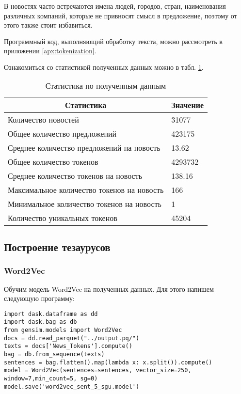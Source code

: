 \documentclass[coursework]{SCWorks}
\begin{document}
В новостях часто встречаются имена людей, городов, стран, наименования различных компаний, которые не привносят смысл в предложение, поэтому от этого также стоит избавиться.

Программный код, выполняющий обработку текста, можно рассмотреть в приложении \ref{apx:tokenization}.

Ознакомиться со статистикой полученных данных можно в табл. \ref{table:preprocess}.
\begin{table}[!h]
    \centering
    \begin{tabular}{|l|l|}
    \hline
    \multicolumn{1}{|c|}{\textbf{Статистика}}  & \multicolumn{1}{c|}{\textbf{Значение}} \\ \hline
    Количество новостей                        & 31077                                  \\ \hline
    Общее количество предложений               & 423175                                 \\ \hline
    Среднее количество предложений на новость  & 13.62                                  \\ \hline
    Общее количество токенов                   & 4293732                                \\ \hline
    Среднее количество токенов на новость      & 138.16                                 \\ \hline
    Максимальное количество токенов на новость & 166                                    \\ \hline
    Минимальное количество токенов на новость  & 1                                      \\ \hline
    Количество уникальных токенов              & 45204                                  \\ \hline
    \end{tabular} 
    \caption{Статистика по полученным данным}
    \label{table:preprocess}
\end{table}

\subsection{Построение тезаурусов}
\subsubsection{Word2Vec}
Обучим модель Word2Vec на полученных данных. Для этого напишем следующую программу:
\begin{verbatim}
import dask.dataframe as dd
import dask.bag as db
from gensim.models import Word2Vec
docs = dd.read_parquet("../output.pq/")
texts = docs['News_Tokens'].compute()
bag = db.from_sequence(texts)
sentences = bag.flatten().map(lambda x: x.split()).compute()
model = Word2Vec(sentences=sentences, vector_size=250, window=7,min_count=5, sg=0)
model.save('word2vec_sent_5_sgu.model')
\end{verbatim}
\end{document}
